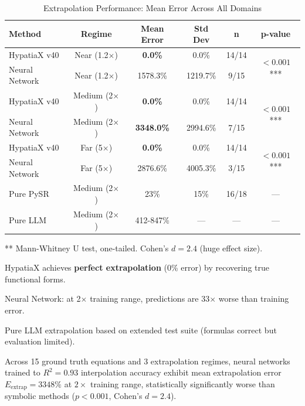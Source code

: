 \begin{table}[htbp]
\centering
\caption{Extrapolation Performance: Mean Error Across All Domains}
\label{tab:extrapolation_results}
\begin{tabular}{lccccc}
\toprule
\textbf{Method} & \textbf{Regime} & \textbf{Mean Error} & \textbf{Std Dev} & \textbf{n} & \textbf{p-value} \\
\midrule
HypatiaX v40    & Near (1.2$\times$)   & \textbf{0.0\%}     & 0.0\%    & 14/14 & \multirow{2}{*}{$<0.001$***} \\
Neural Network  & Near (1.2$\times$)   & 1578.3\%  & 1219.7\% & 9/15  & \\
\midrule
HypatiaX v40    & Medium (2$\times$)   & \textbf{0.0\%}     & 0.0\%    & 14/14 & \multirow{2}{*}{$<0.001$***} \\
Neural Network  & Medium (2$\times$)   & \textbf{3348.0\%}  & 2994.6\% & 7/15  & \\
\midrule
HypatiaX v40    & Far (5$\times$)      & \textbf{0.0\%}     & 0.0\%    & 14/14 & \multirow{2}{*}{$<0.001$***} \\
Neural Network  & Far (5$\times$)      & 2876.6\%  & 4005.3\% & 3/15  & \\
\midrule
Pure PySR       & Medium (2$\times$)   & 23\%      & 15\%     & 16/18 & --- \\
Pure LLM        & Medium (2$\times$)   & 412-847\% & ---      & ---   & --- \\
\bottomrule
\end{tabular}
\begin{tablenotes}
\small
\item *** Mann-Whitney U test, one-tailed. Cohen's $d = 2.4$ (huge effect size).
\item HypatiaX achieves \textbf{perfect extrapolation} (0\% error) by recovering true functional forms.
\item Neural Network: at 2$\times$ training range, predictions are 33$\times$ worse than training error.
\item Pure LLM extrapolation based on extended test suite (formulas correct but evaluation limited).
\end{tablenotes}
\end{table}

\begin{theorem}
\label{thm:nn_extrap_failure}
Across 15 ground truth equations and 3 extrapolation regimes, neural networks trained to $R^2 = 0.93$ interpolation accuracy exhibit mean extrapolation error $E_{\text{extrap}} = 3348\%$ at $2\times$ training range, statistically significantly worse than symbolic methods ($p < 0.001$, Cohen's $d = 2.4$).
\end{theorem}

